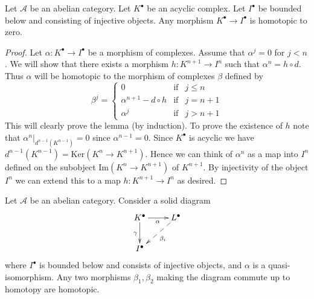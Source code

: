 \begin{lemma}
\label{lemma-acyclic-is-zero}
Let $\mathcal{A}$ be an abelian category.
Let $K^\bullet$ be an acyclic complex.
Let $I^\bullet$ be bounded below and consisting of injective objects.
Any morphism $K^\bullet \to I^\bullet$ is homotopic to zero.
\end{lemma}

\begin{proof}
Let $\alpha : K^\bullet \to I^\bullet$ be a morphism of
complexes. Assume that $\alpha^j = 0$ for $j < n$.
We will show that there exists a morphism $h : K^{n + 1} \to I^n$
such that $\alpha^n = h \circ d$. Thus $\alpha$ will be homotopic
to the morphism of complexes $\beta$ defined by
$$
\beta^j =
\left\{
\begin{matrix}
0 & \text{if} & j \leq n \\
\alpha^{n + 1} - d \circ h & \text{if} & j = n + 1 \\
\alpha^j & \text{if} & j > n + 1
\end{matrix}
\right.
$$
This will clearly prove the lemma (by induction).
To prove the existence of $h$ note that
$\alpha^n|_{d^{n - 1}(K^{n - 1})} = 0$ since
$\alpha^{n - 1} = 0$. Since $K^\bullet$ is acyclic we
have $d^{n - 1}(K^{n - 1}) = \text{Ker}(K^n \to K^{n + 1})$.
Hence we can think of $\alpha^n$ as a map into $I^n$ defined
on the subobject $\text{Im}(K^n \to K^{n + 1})$ of $K^{n + 1}$.
By injectivity of the object $I^n$ we can extend this to
a map $h : K^{n + 1} \to I^n$ as desired.
\end{proof}

\begin{lemma}
\label{lemma-morphisms-equal-up-to-homotopy}
Let $\mathcal{A}$ be an abelian category.
Consider a solid diagram
$$
\xymatrix{
K^\bullet \ar[r]_\alpha \ar[d]_\gamma & L^\bullet \ar@{-->}[dl]^{\beta_i} \\
I^\bullet
}
$$
where $I^\bullet$ is bounded below and consists of injective
objects, and $\alpha$ is a quasi-isomorphism.
Any two morphisms $\beta_1, \beta_2$ making the diagram commute
up to homotopy are homotopic.
\end{lemma}

